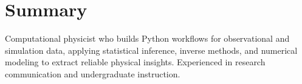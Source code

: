 \section{Summary}
\small{
Computational physicist who builds Python workflows for observational and simulation data, applying statistical inference, inverse methods, and numerical modeling to extract reliable physical insights. Experienced in research communication and undergraduate instruction.
}
